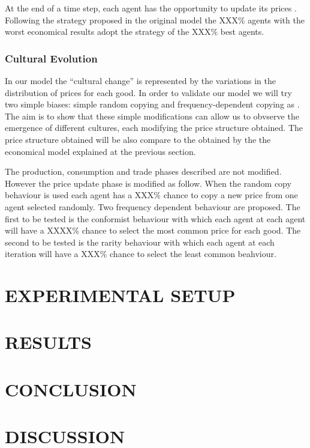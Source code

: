 \documentclass{wscpaperproc}
\begin{document}
At the end of a time step, each agent has the opportunity to update its prices . Following the strategy proposed in the original model the XXX\% agents with the worst economical results adopt the strategy of the XXX\% best agents.


\subsubsection{Cultural Evolution}

In our model the ``cultural change'' is represented by the variations in the distribution of prices for each good. In order to validate our model we will try two simple biases: simple random copying and frequency-dependent copying as \cite{mesoudi_random_2009}. The aim is to show that these simple modifications can allow us to obvserve the emergence of different cultures, each modifying the price structure obtained. The price structure obtained will be also compare to the obtained by the the economical model explained at the previous section.

The production, consumption and trade phases described are not modified. However the price update phase is modified as follow. When the random copy behaviour is used each agent has a XXX\% chance to copy a new price from one agent selected randomly. Two frequency dependent behaviour are proposed. The first to be tested is the conformist behaviour with which each agent at each agent will have a XXXX\% chance to select the most common price for each good. The second to be tested is the rarity behaviour with which each agent at each iteration will have a XXX\% chance to select the least common beahviour.



\section{EXPERIMENTAL SETUP}

\section{RESULTS}

\section{CONCLUSION}

\section{DISCUSSION}
\end{document}
